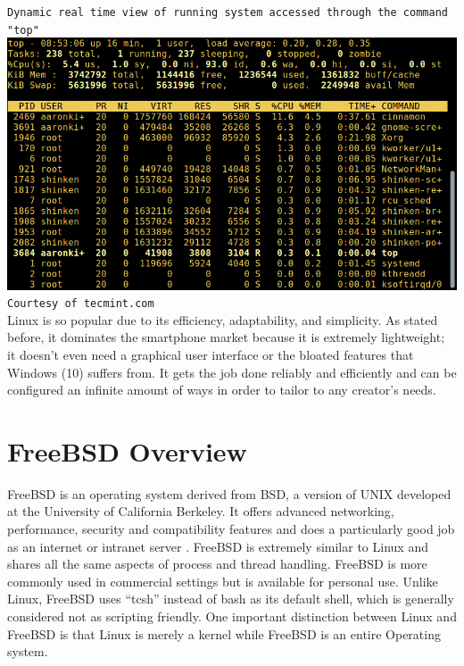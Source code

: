 \documentclass[onecolumn, draftclsnofoot,10pt, compsoc]{IEEEtran}
\begin{document}
	\texttt{Dynamic real time view of running system accessed through the command "top"} \\
	\includegraphics[scale=.5]{top.png} \\
	\texttt{Courtesy of tecmint.com} \\
	
	Linux is so popular due to its efficiency, adaptability, and simplicity. As stated before, it dominates the smartphone market because it is extremely lightweight; it doesn’t even need a graphical user interface or the bloated features that Windows (10) suffers from. It gets the job done reliably and efficiently and can be configured an infinite amount of ways in order to tailor to any creator’s needs. \\

\section{FreeBSD Overview}
	FreeBSD is an operating system derived from BSD, a version of UNIX developed at the University of California Berkeley. It offers advanced networking, performance, security and compatibility features and does a particularly good job as an internet or intranet server \cite{FreeBSD}. FreeBSD is extremely similar to Linux and shares all the same aspects of process and thread handling. FreeBSD is more commonly used in commercial settings but is available for personal use. Unlike Linux, FreeBSD uses “tcsh” instead of bash as its default shell, which is generally considered not as scripting friendly. One important distinction between Linux and FreeBSD is that Linux is merely a kernel while FreeBSD is an entire Operating system. \\
	
\end{document}
